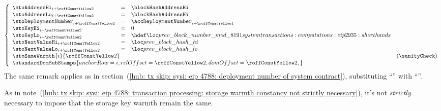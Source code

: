 \item[\underline{\underline{Storing the \inst{BLOCKHASH} in the state:}}] 
	\[
		\left\{ \begin{array}{lclr}
			\stoAddressHi         _{i + \roffTxSkipSysiBlockHashSystemContractStorage} & = & \blockHashAddressHi                                                      \\
			\stoAddressLo         _{i + \roffTxSkipSysiBlockHashSystemContractStorage} & = & \blockHashAddressHi                                                      \\
			\stoDeploymentNumber  _{i + \roffTxSkipSysiBlockHashSystemContractStorage} & = & \accDeploymentNumber _{i + \roffTxSkipSysiBlockHashSystemContractAccount} \\
			\stoKeyHi             _{i + \roffTxSkipSysiBlockHashSystemContractStorage} & = & 0                                                                         \\
			\stoKeyLo             _{i + \roffTxSkipSysiBlockHashSystemContractStorage} & = & \locPreviousBlockNumberModuloPrime                                          \\
			\stoNextValueHi       _{i + \roffTxSkipSysiBlockHashSystemContractStorage} & = & \locPreviousBlockHashHi                                                   \\
			\stoNextValueLo       _{i + \roffTxSkipSysiBlockHashSystemContractStorage} & = & \locPreviousBlockHashLo                                                   \\
			\multicolumn{3}{l}{\stoSameWarmth  {i}{\roffTxSkipSysiBlockHashSystemContractStorage} } & (\sanityCheck) \\
			\multicolumn{3}{l}{
				\standardDomSubStamps {
					anchorRow = i                                             ,
					relOffset = \roffTxSkipSysiBlockHashSystemContractStorage ,
					domOffset = \roffTxSkipSysiBlockHashSystemContractStorage ,
				}} \\
		\end{array} \right.
	\]
	\saNote{} \label{hub: tx skip: sysi: eip 2935: deployment number of system contract}
	The same remark applies as in
	section~(\ref{hub: tx skip: sysi: eip 4788: deployment number of system contract}),
	substituting
	``\beaconRootAddress''
	with
	``\blockHashAddress''.

	\saNote{}
	As in note~(\ref{hub: tx skip: sysi: eip 4788: transaction processing: storage warmth constancy not strictly necessary}),
	it's not \emph{strictly} necessary to impose that the storage key warmth remain the same.
